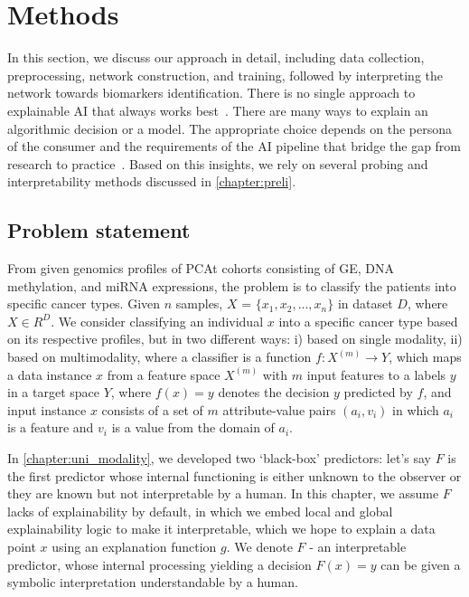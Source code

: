 \section{Methods}\label{chapter_5:mm}
In this section, we discuss our approach in detail, including data collection, preprocessing, network construction, and training, followed by interpreting the network towards biomarkers identification. There is no single approach to explainable AI that always works best~\cite{arya2019one}. There are many ways to explain an algorithmic decision or a model. The appropriate choice depends on the persona of the consumer and the requirements of the AI pipeline that bridge the gap from research to practice~\cite{arya2019one}. Based on this insights, we rely on several probing and interpretability methods discussed in \cref{chapter:preli}. 

\subsection{Problem statement}
From given genomics profiles of PCAt cohorts consisting of GE, DNA methylation, and miRNA expressions, the problem is to classify the patients into specific cancer types. Given $n$ samples, $X$ = ${{\{x_1,x_2, ..., x_n}}\}$ in dataset $D$, where $X \in {R}^{D}$. We consider classifying an individual $x$ into a specific cancer type based on its respective profiles, but in two different ways: i) based on single modality, ii) based on multimodality, where a  classifier is a function $f: {X}^{(m)} \rightarrow {Y}$, which maps a data instance $x$ from a feature space ${X}^{(m)}$ with $m$ input features to a labels $y$ in a target space ${Y}$, where $f(x)=y$ denotes the decision $y$ predicted by $f$, and input instance $x$ consists of a set of $m$ attribute-value pairs $\left(a_{i}, v_{i}\right)$ in which $a_i$ is a feature and $v_i$ is a value from the domain of $a_i$. 

\hspace*{3.5mm} In \cref{chapter:uni_modality}, we developed two `black-box' predictors: let's say $F$ is the first predictor whose internal functioning is either unknown to the observer or they are known but not interpretable by a human. In this chapter, we assume $F$ lacks of explainability by default, in which we embed local and global explainability logic to make it interpretable, which we hope to explain a data point $x$ using an explanation function $g$. We denote ${F}$ - an interpretable predictor, whose internal processing yielding a decision ${F}(x)=y$ can be given a symbolic interpretation understandable by a human. 

